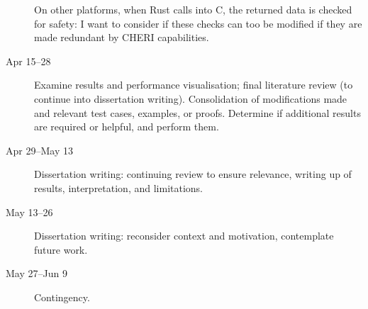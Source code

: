 \documentclass[11pt]{article}
\begin{document}
\begin{description}
  On other platforms, when Rust calls into C, the returned data is checked for safety: I want to consider if these checks can too be modified if they are made redundant by CHERI capabilities.
  \item [Apr 15--28] Examine results and performance visualisation; final literature review (to continue into dissertation writing).
  Consolidation of modifications made and relevant test cases, examples, or proofs.
  Determine if additional results are required or helpful, and perform them.
  \item [Apr 29--May 13] Dissertation writing: continuing review to ensure relevance, writing up of results, interpretation, and limitations.
  \item [May 13--26] Dissertation writing: reconsider context and motivation, contemplate future work.
  \item [May 27--Jun 9] Contingency.
\end{description}




\newpage
\appendix
\end{document}
